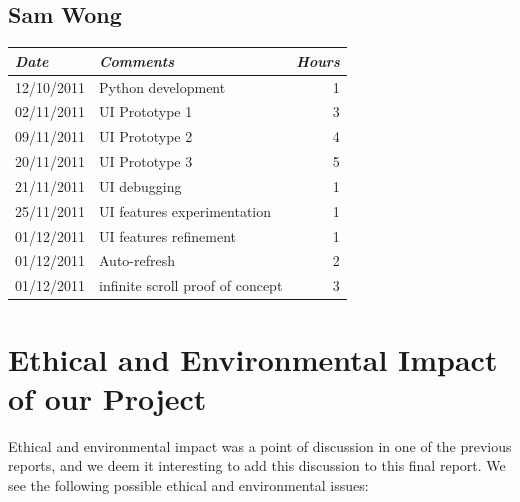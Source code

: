 \documentclass{report}
\begin{document}
		  \subsection{Sam Wong}
		  \begin{tabular}{l | p{10cm} r}
	     \emph{\large Date} & \emph{\large Comments} & \emph{\large Hours}\\
	     \hline
		   12/10/2011 & Python development & 1\\
	     02/11/2011 & UI Prototype 1 & 3\\
	     09/11/2011 & UI Prototype 2 & 4\\
	     20/11/2011 & UI Prototype 3 & 5\\
	     21/11/2011 & UI debugging & 1\\
	     25/11/2011 & UI features experimentation & 1\\
	     01/12/2011 & UI features refinement & 1\\
	     01/12/2011 & Auto-refresh & 2\\
	     01/12/2011 & infinite scroll proof of concept & 3\\
	    \end{tabular}
	
	\section{Ethical and Environmental Impact of our Project}	

	Ethical and environmental impact was a point of discussion in one of the previous reports, and we deem it interesting to add this discussion to this final report. We see the following possible ethical and environmental issues:
\end{document}
